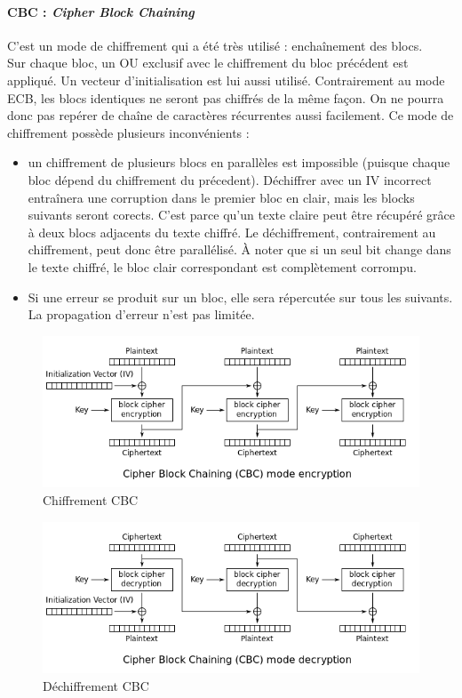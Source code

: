 \paragraph{CBC : \textit{Cipher Block Chaining} \\}
C'est un mode de chiffrement qui a été très utilisé : enchaînement des blocs.\\
Sur chaque bloc, un OU exclusif avec le chiffrement du bloc précédent est appliqué. Un vecteur d'initialisation est lui aussi utilisé. Contrairement au mode ECB, les blocs identiques ne seront pas chiffrés de la même façon. On ne pourra donc pas repérer de chaîne de caractères récurrentes aussi facilement. Ce mode de chiffrement possède plusieurs inconvénients :
\begin{itemize}
\item un chiffrement de plusieurs blocs en parallèles est impossible (puisque chaque bloc dépend du chiffrement du précedent). Déchiffrer avec un IV incorrect entraînera une corruption dans le premier bloc en clair, mais les blocks suivants seront corects. C'est parce qu'un texte claire peut être récupéré grâce à deux blocs adjacents du texte chiffré. Le déchiffrement, contrairement au chiffrement, peut donc être parallélisé. À noter que si un seul bit change dans le texte chiffré, le bloc clair correspondant est complètement corrompu.
\item Si une erreur se produit sur un bloc, elle sera répercutée sur tous les suivants. La propagation d'erreur n'est pas limitée.
\end{itemize}
\begin{figure}[H]
\centering
\includegraphics[width=13cm]{images/CBC_chiff.png}
\caption{Chiffrement CBC}
\label{CBC_chiff}
\end{figure}

\begin{figure}[H]
\centering
\includegraphics[width=13cm]{images/CBC_dechiff.png}
\caption{Déchiffrement CBC}
\label{CBC_dechiff}
\end{figure}

